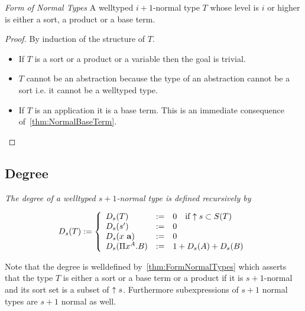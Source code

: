 \begin{theorem}
    \label{thm:FormNormalTypes}
    \emph{Form of Normal Types} A welltyped $i+1$-normal type $T$ whose level is
    $i$ or higher is either a sort, a product or a base term.


    \begin{proof}
        By induction of the structure of $T$.
        \begin{itemize}

            \item If $T$ is a sort or a product or a variable then the goal is
                trivial.

            \item $T$ cannot be an abstraction because the type of an
                abstraction cannot be a sort i.e. it cannot be a welltyped type.

            \item If $T$ is an application it is a base term. This is an
                immediate consequence of~\ref{thm:NormalBaseTerm}.
        \end{itemize}
    \end{proof}
\end{theorem}



\subsection{Degree}

\begin{definition}
    \label{def:TypeDegree}
    \emph{The degree of a welltyped $s+1$-normal type is defined recursively by}

    $$
    D_s(T) :=
    \dcases{
        D_s(T) &:=& 0 \quad\text{if } \upper s \subset S(T)
        \\
        D_s(s') &:=& 0
        \\
        D_s(x \vec a) &:=& 0
        \\
        D_s(\Pi x^A.B) &:=&
        1 + D_s(A) +  D_s(B)
    }
    $$

    Note that the degree is welldefined by~\ref{thm:FormNormalTypes} which
    asserts that the type $T$ is either a sort or a base term or a product if it
    is $s+1$-normal and
    its sort set is a subset of ${\uparrow s}$.
    Furthermore subexpressions of $s+1$ normal types are $s+1$ normal as well.
\end{definition}



